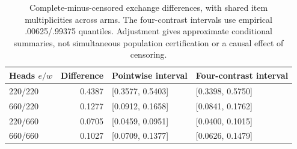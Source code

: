 \begin{table}[t]\centering\small
\caption{Complete-minus-censored exchange differences, with shared item multiplicities across arms. The four-contrast intervals use empirical .00625/.99375 quantiles. Adjustment gives approximate conditional summaries, not simultaneous population certification or a causal effect of censoring.}\label{tab:v8-exchange-difference}
\begin{tabular}{lrll}\toprule
Heads $e/w$ & Difference & Pointwise interval & Four-contrast interval\\\midrule
220/220 & 0.4387 & [0.3577, 0.5403] & [0.3398, 0.5750] \\
660/220 & 0.1277 & [0.0912, 0.1658] & [0.0841, 0.1762] \\
220/660 & 0.0705 & [0.0459, 0.0951] & [0.0400, 0.1015] \\
660/660 & 0.1027 & [0.0709, 0.1377] & [0.0626, 0.1479] \\
\bottomrule\end{tabular}\end{table}
